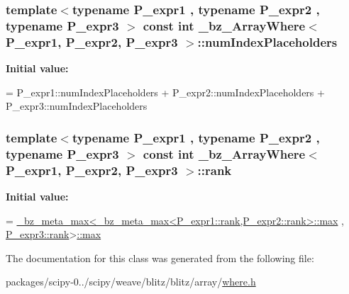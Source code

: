 \subsubsection[{num\+Index\+Placeholders}]{\setlength{\rightskip}{0pt plus 5cm}template$<$typename P\+\_\+expr1 , typename P\+\_\+expr2 , typename P\+\_\+expr3 $>$ const int {\bf \+\_\+bz\+\_\+\+Array\+Where}$<$ P\+\_\+expr1, P\+\_\+expr2, P\+\_\+expr3 $>$\+::num\+Index\+Placeholders\hspace{0.3cm}{\ttfamily [static]}}\label{class__bz__ArrayWhere_ab1e37cbc576023cb9ff10dcf7a2412eb}
{\bfseries Initial value\+:}
\begin{DoxyCode}
= P\_expr1::numIndexPlaceholders
                             + P\_expr2::numIndexPlaceholders
                             + P\_expr3::numIndexPlaceholders
\end{DoxyCode}
\hypertarget{class__bz__ArrayWhere_ad72a01a0949053944abf6f1e4da15f67}{}
\subsubsection[{rank}]{\setlength{\rightskip}{0pt plus 5cm}template$<$typename P\+\_\+expr1 , typename P\+\_\+expr2 , typename P\+\_\+expr3 $>$ const int {\bf \+\_\+bz\+\_\+\+Array\+Where}$<$ P\+\_\+expr1, P\+\_\+expr2, P\+\_\+expr3 $>$\+::rank\hspace{0.3cm}{\ttfamily [static]}}\label{class__bz__ArrayWhere_ad72a01a0949053944abf6f1e4da15f67}
{\bfseries Initial value\+:}
\begin{DoxyCode}
= \hyperlink{class__bz__meta__max}{\_bz\_meta\_max<\_bz\_meta\_max<P\_expr1::rank,P\_expr2::rank>::max}
      ,
                            \hyperlink{zfftnd_8c_a6cfd95afd0afebd625b889fb6e58371c}{P\_expr3::rank}>\hyperlink{dlamch_8c_affe776513b24d84b39af8ab0930fef7f}{::max}
\end{DoxyCode}


The documentation for this class was generated from the following file\+:\begin{DoxyCompactItemize}
\item 
packages/scipy-\/0../scipy/weave/blitz/blitz/array/\hyperlink{where_8h}{where.\+h}\end{DoxyCompactItemize}
